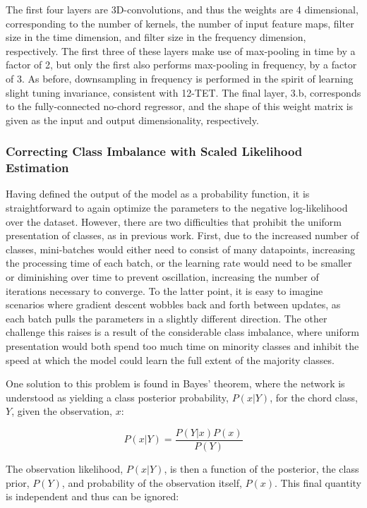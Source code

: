 The first four layers are 3D-convolutions, and thus the weights are 4 dimensional, corresponding to the number of kernels, the number of input feature maps, filter size in the time dimension, and filter size in the frequency dimension, respectively.
The first three of these layers make use of max-pooling in time by a factor of 2, but only the first also performs max-pooling in frequency, by a factor of 3.
As before, downsampling in frequency is performed in the spirit of learning slight tuning invariance, consistent with 12-TET.
The final layer, 3.b, corresponds to the fully-connected no-chord regressor, and the shape of this weight matrix is given as the input and output dimensionality, respectively.


\subsubsection{Correcting Class Imbalance with Scaled Likelihood Estimation}
\label{subsubsec:scaled_likelihood_estimation}
Having defined the output of the model as a probability function, it is straightforward to again optimize the parameters to the negative log-likelihood over the dataset.
However, there are two difficulties that prohibit the uniform presentation of classes, as in previous work.
First, due to the increased number of classes, mini-batches would either need to consist of many datapoints, increasing the processing time of each batch, or the learning rate would need to be smaller or diminishing over time to prevent oscillation, increasing the number of iterations necessary to converge.
To the latter point, it is easy to imagine scenarios where gradient descent wobbles back and forth between updates, as each batch pulls the parameters in a slightly different direction.
The other challenge this raises is a result of the considerable class imbalance, where uniform presentation would both spend too much time on minority classes and inhibit the speed at which the model could learn the full extent of the majority classes.

One solution to this problem is found in Bayes' theorem, where the network is understood as yielding a class posterior probability, $P(x|Y)$, for the chord class, $Y$, given the observation, $x$:

\begin{equation}
P(x|Y) = \frac{P(Y|x)P(x)}{P(Y)}
\end{equation}

The observation likelihood, $P(x|Y)$, is then a function of the posterior, the class prior, $P(Y)$, and probability of the observation itself, $P(x)$.
This final quantity is independent and thus can be ignored:

